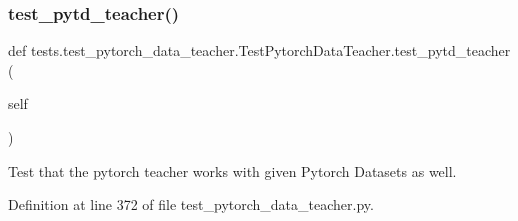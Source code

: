 \subsubsection{\texorpdfstring{test\+\_\+pytd\+\_\+teacher()}{test\_pytd\_teacher()}}
{\footnotesize\ttfamily def tests.\+test\+\_\+pytorch\+\_\+data\+\_\+teacher.\+Test\+Pytorch\+Data\+Teacher.\+test\+\_\+pytd\+\_\+teacher (\begin{DoxyParamCaption}\item[{}]{self }\end{DoxyParamCaption})}

\begin{DoxyVerb}Test that the pytorch teacher works with given Pytorch Datasets as well.
\end{DoxyVerb}
 

Definition at line 372 of file test\+\_\+pytorch\+\_\+data\+\_\+teacher.\+py.


